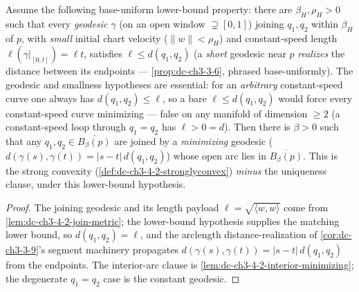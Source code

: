 \begin{lemma}
  \label{lem:dc-ch3-4-2-minimizing-interior}
  \leanok
  Assume the following base-uniform lower-bound property: there are $\beta_H,\rho_H>0$ such that every
  \emph{geodesic} $\gamma$ (on an open window $\supsetneq[0,1]$) joining $q_1,q_2$ within $\beta_H$ of
  $p$, with \emph{small} initial chart velocity ($\|w\|<\rho_H$) and constant-speed length
  $\ell(\gamma|_{[0,t]})=\ell t$, satisfies $\ell\le d(q_1,q_2)$ (a \emph{short} geodesic near $p$
  \emph{realizes} the distance between its endpoints --- \cref{prop:dc-ch3-3-6}, phrased
  base-uniformly). The geodesic and smallness hypotheses are essential: for an \emph{arbitrary}
  constant-speed curve one always has $d(q_1,q_2)\le\ell$, so a bare $\ell\le d(q_1,q_2)$ would force
  every constant-speed curve minimizing --- false on any manifold of dimension $\ge2$ (a constant-speed
  loop through $q_1=q_2$ has $\ell>0=d$). Then there is
  $\beta>0$ such that any $q_1,q_2\in\overline{B_\beta(p)}$ are joined by a \emph{minimizing} geodesic
  ($d(\gamma(s),\gamma(t))=|s-t|\,d(q_1,q_2)$) whose open arc lies in $\overline{B_\beta(p)}$. This is
  the strong convexity (\cref{def:dc-ch3-4-2-stronglyconvex}) \emph{minus} the uniqueness
  clause, under this lower-bound hypothesis.
\end{lemma}
\begin{proof}
  \sketch
  \leanok
  The joining geodesic and its length payload $\ell=\sqrt{\langle w,w\rangle}$ come from
  \cref{lem:dc-ch3-4-2-join-metric}; the lower-bound hypothesis supplies the matching lower bound, so
  $d(q_1,q_2)=\ell$,
  and the arclength distance-realization of \cref{cor:dc-ch3-3-9}'s segment machinery propagates
  $d(\gamma(s),\gamma(t))=|s-t|\,d(q_1,q_2)$ from the endpoints. The interior-arc clause is
  \cref{lem:dc-ch3-4-2-interior-minimizing}; the degenerate $q_1=q_2$ case is the constant geodesic.

\end{proof}

